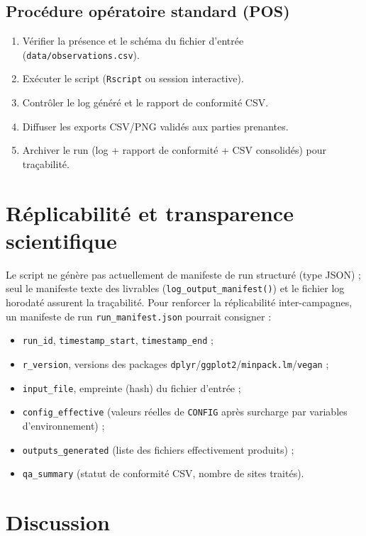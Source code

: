 \documentclass[11pt,a4paper]{article}
\begin{document}
\subsection{Procédure opératoire standard (POS)}
\begin{enumerate}
  \item Vérifier la présence et le schéma du fichier d'entrée (\texttt{data/observations.csv}).
  \item Exécuter le script (\texttt{Rscript} ou session interactive).
  \item Contrôler le log généré et le rapport de conformité CSV.
  \item Diffuser les exports CSV/PNG validés aux parties prenantes.
  \item Archiver le run (log + rapport de conformité + CSV consolidés) pour traçabilité.
\end{enumerate}

\section{Réplicabilité et transparence scientifique}
Le script ne génère pas actuellement de manifeste de run structuré (type JSON) ; seul le
manifeste texte des livrables (\texttt{log\_output\_manifest()}) et le fichier log horodaté
assurent la traçabilité. Pour renforcer la réplicabilité inter-campagnes, un manifeste de
run \texttt{run\_manifest.json} pourrait consigner :
\begin{itemize}[leftmargin=1.2cm]
  \item \texttt{run\_id}, \texttt{timestamp\_start}, \texttt{timestamp\_end} ;
  \item \texttt{r\_version}, versions des packages \texttt{dplyr}/\texttt{ggplot2}/\texttt{minpack.lm}/\texttt{vegan} ;
  \item \texttt{input\_file}, empreinte (hash) du fichier d'entrée ;
  \item \texttt{config\_effective} (valeurs réelles de \texttt{CONFIG} après surcharge par variables d'environnement) ;
  \item \texttt{outputs\_generated} (liste des fichiers effectivement produits) ;
  \item \texttt{qa\_summary} (statut de conformité CSV, nombre de sites traités).
\end{itemize}

\section{Discussion}
\end{document}
